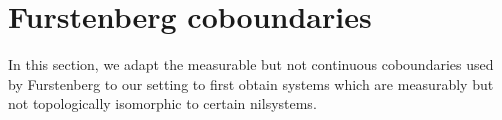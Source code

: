 \documentclass[12pt]{amsart}
\theoremstyle{definition}
\theoremstyle{plain}
\newtheorem{lemma}[theorem]{Lemma}
\theoremstyle{definition}
\numberwithin{equation}{section}
\begin{document}
\section{Furstenberg coboundaries}

In this section, we adapt the measurable but not continuous coboundaries used by Furstenberg to our setting to first obtain systems which are measurably but not topologically isomorphic to certain nilsystems.

\end{document}
